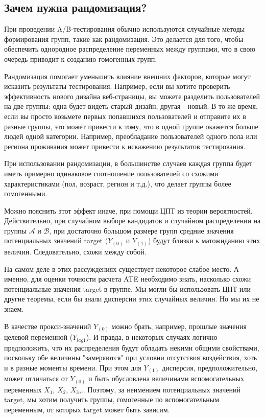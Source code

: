         \subsection{Зачем нужна рандомизация?}
            При проведении A/B-тестирования обычно используются случайные методы формирования групп, такие как рандомизация.
            Это делается для того, чтобы обеспечить однородное распределение переменных между группами, что в свою очередь приводит к созданию гомогенных групп.

            Рандомизация помогает уменьшить влияние внешних факторов, которые могут исказить результаты тестирования.
            Например, если вы хотите проверить эффективность нового дизайна веб-страницы, вы можете разделить пользователей на две группы: одна будет видеть старый дизайн, другая - новый.
            В то же время, если вы просто возьмете первых попавшихся пользователей и отправите их в разные группы, это может привести к тому, что в одной группе окажется больше людей одной категории.
            Например, преобладание пользователей одного пола или региона проживания может привести к искажению результатов тестирования.

            При использовании рандомизации, в большинстве случаев каждая группа будет иметь примерно одинаковое соотношение пользователей со схожими характеристиками (пол, возраст, регион и т.д.), что делает группы более гомогенными.

            Можно пояснить этот эффект иначе, при помощи ЦПТ из теории вероятностей.
            Действительно, при случайном выборе кандидатов и случайном распределении на группы $\mathcal{A}$ и $\mathcal{B}$, при достаточно большом размере групп средние значения потенциальных значений target ($Y_{(0)}$ и $Y_{(1)}$) будут близки к матожиданию этих величин.
            Следовательно, схожи между собой.

            На самом деле в этих рассуждениях существует некоторое слабое место. А именно, для оценки точности расчета ATE необходимо знать, насколько схожи потенциальные значения target в группе. Мы могли бы использовать ЦПТ или другие теоремы, если бы знали дисперсии этих случайных величин. Но мы их не знаем.

            В качестве прокси-значений $Y_(0)$ можно брать, например, прошлые значения целевой переменной ($Y_{lag 1}$). И правда, в некоторых случаях логично предположить, что их распределения будут обладать некими общими свойствами, поскольку обе величины "замеряются" при условии отсутствия воздействия, хоть и в разные моменты времени.
            При этом для $Y_(1)$ дисперсия, предположительно, может отличаться от $Y_(0)$ и быть обусловлена величинами вспомогательных переменных $X_1$, $X_2$, $X_3$,.. Поэтому, за неимением потенциальных значений target, мы хотим получить группы, гомогенные по вспомогательным переменным, от которых target может быть зависим.

